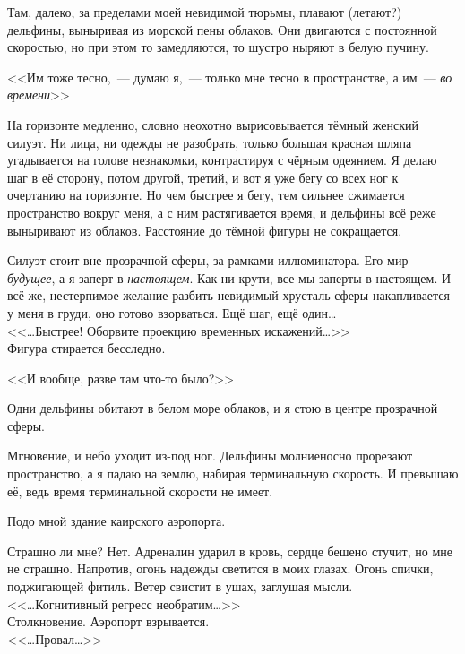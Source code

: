 \documentclass[openany, oneside]{book}
\begin{document}
Там, далеко, за пределами моей невидимой тюрьмы, плавают (летают?) дельфины, выныривая из морской пены облаков. Они двигаются с постоянной скоростью, но при этом то замедляются, то шустро ныряют в белую пучину.

<<Им тоже тесно,~--- думаю я,~--- только мне тесно в пространстве, а им~--- \textit{во времени}>>

На горизонте медленно, словно неохотно вырисовывается тёмный женский силуэт. Ни лица, ни одежды не разобрать, только большая красная шляпа угадывается на голове незнакомки, контрастируя с чёрным одеянием. Я делаю шаг в её сторону, потом другой, третий, и вот я уже бегу со всех ног к очертанию на горизонте. Но чем быстрее я бегу, тем сильнее сжимается пространство вокруг меня, а с ним растягивается время, и дельфины всё реже выныривают из облаков. Расстояние до тёмной фигуры не сокращается.

Силуэт стоит вне прозрачной сферы, за рамками иллюминатора. Его мир~--- \textit{будущее}, а я заперт в \textit{настоящем}. Как ни крути, все мы заперты в настоящем. И всё же, нестерпимое желание разбить невидимый хрусталь сферы накапливается у меня в груди, оно готово взорваться. Ещё шаг, ещё один\dots\\

<<\dots Быстрее! Оборвите проекцию временных искажений\dots>>\\

Фигура стирается бесследно.

<<И вообще, разве там что-то было?>>

Одни дельфины обитают в белом море облаков, и я стою в центре прозрачной сферы.

Мгновение, и небо уходит из-под ног. Дельфины молниеносно прорезают пространство, а я падаю на землю, набирая терминальную скорость. И превышаю её, ведь время терминальной скорости не имеет.

Подо мной здание каирского аэропорта.

Страшно ли мне? Нет. Адреналин ударил в кровь, сердце бешено стучит, но мне не страшно. Напротив, огонь надежды светится в моих глазах. Огонь спички, поджигающей фитиль. Ветер свистит в ушах, заглушая мысли.\\

<<\dots Когнитивный регресс необратим\dots>>\\

Столкновение. Аэропорт взрывается.\\

<<\dots Провал\dots>>
\end{document}
